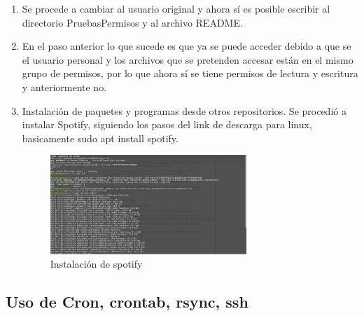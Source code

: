 \documentclass[11pt]{article}
\begin{document}
\begin{enumerate}
\item Se procede a cambiar al usuario original y ahora sí es posible escribir al directorio PruebasPermisos y al archivo README.


\item En el paso anterior lo que sucede es que ya se puede acceder debido a que se el usuario personal y los archivos que se pretenden accesar están en el mismo grupo de permisos, por lo que ahora sí se tiene permisos de lectura y escritura y anteriormente no.


 
 \item Instalación de paquetes y programas desde otros repositorios. Se procedió a instalar Spotify, siguiendo los pasos del link de descarga para linux, basicamente sudo apt install spotify.
 
 \begin{figure}[H]
  \centering
    \includegraphics[width=0.7\textwidth]{img/28}
  \caption{Instalación de spotify}
\end{figure}

\end{enumerate}

 
 \subsection{Uso de Cron, crontab, rsync, ssh}
\end{document}
